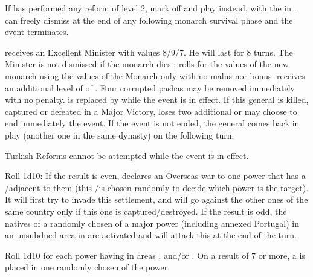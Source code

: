 

\aparag If \TUR has performed any reform of level 2, mark off and play \RD
instead, with the \REVOLT in \TUR.
\aparag \TUR can freely dismiss  at the end of any
following monarch survival phase and the event terminates.

\phevnt
\aparag \TUR receives an Excellent Minister \ministreKoprulu with values
8/9/7. He will last for 8 turns.
The Minister is not dismissed if the \TUR monarch dies ; \TUR rolls for the
values of the new monarch using the values of the Monarch only with no malus
nor bonus.
\aparag \TUR receives an additional level of \MNU of .
\aparag Four corrupted pashas may be removed immediately with no penalty.
\aparag {} is replaced by \leaderKoprulu while the event is
in effect. If this general is killed, captured or defeated in a Major Victory,
\TUR loses two additional \STAB or may choose to end immediately the event. If
the event is not ended, the general comes back in play (another one in the
same dynasty) on the following turn.

\phadm
\aparag Turkish Reforms cannot be attempted while the event is in effect.




\phevnt
\aparag Roll 1d10:
\bparag If the result is even, \paysIroquois declares an Overseas war to one
power that has a \COL/\TP adjacent to them (this \COL/\TP is chosen randomly
to decide which power is the target). It will first try to invade this
settlement, and will go against the other ones of the same country only if
this one is captured/destroyed.
\bparag If the result is odd, the natives of a randomly chosen \COL of a major
power (including annexed Portugal) in an unsubdued area in  are activated and will attack this \COL at the end of the turn.




\phevnt
\aparag Roll 1d10 for each power having \COL in areas \granderegionCuba,
\granderegionHaiti and/or \granderegionAntilles. On a result of 7 or more, a
\REVOLT \facemoins is placed in one randomly chosen \COL of the power.



